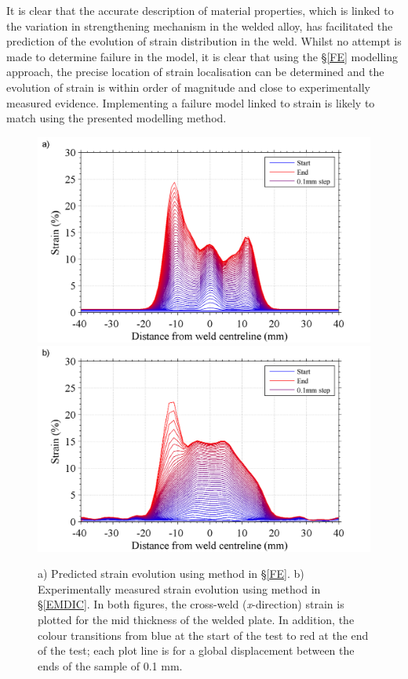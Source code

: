 It is clear that the accurate description of material properties, which is linked to the variation in strengthening mechanism in the welded alloy, has facilitated the prediction of the evolution of strain distribution in the weld. Whilst no attempt is made to determine failure in the model, it is clear that using the \S\ref{FE} modelling approach, the precise location of strain localisation can be determined and the evolution of strain is within order of magnitude and close to experimentally measured evidence. Implementing a failure model linked to strain is likely to match using the presented modelling method.
\begin{figure}
	\centering
	\includegraphics[width=0.7\linewidth]{PredictedXstrainaltered}		\includegraphics[width=0.7\linewidth]{DICcrossweldStrainaltered}
	\caption[Mesh]{a) Predicted strain evolution using method in \S\ref{FE}. b) Experimentally measured strain evolution using method in \S\ref{EMDIC}. In both figures, the cross-weld (\textit{x}-direction) strain is plotted for the mid thickness of the welded plate. In addition, the colour transitions from blue at the start of the test to red at the end of the test; each plot line is for a global displacement between the ends of the sample of 0.1 mm.}
	\label{fig:UniaxialStrainPredicted}	
\end{figure} 

